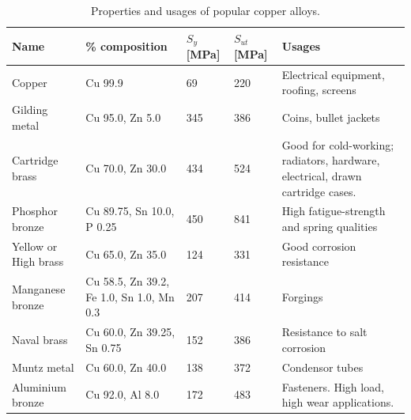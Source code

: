 \documentclass[
10pt,
a4paper,
openany,
svgnames,
]{book}
\begin{document}
\begin{table}[H]
  \centering
  \caption{Properties and usages of popular copper alloys.}
  \label{tab: copper alloy props and uses}
  {\renewcommand{\arraystretch}{1.4}
  \begin{tabular}{lL{3cm}llL{4cm}}
    \toprule
    Name                 & \% composition                           & $S_y$ [MPa] & $S_{ut}$ [MPa] & Usages                                                                                              \\
    \midrule
    Copper               & Cu 99.9                                  & 69          & 220             & Electrical equipment, roofing, screens                                                                   \\
    Gilding metal        & Cu 95.0, Zn 5.0                          & 345          & 386             & Coins, bullet jackets                                                                                    \\
    Cartridge brass      & Cu 70.0, Zn 30.0                         & 434          & 524             & Good for cold-working; radiators, hardware, electrical, drawn cartridge cases.                           \\
    Phosphor bronze      & Cu 89.75, Sn 10.0, P 0.25                & 450           & 841            & High fatigue-strength and spring qualities                                                               \\
    Yellow or High brass & Cu 65.0, Zn 35.0                         & 124          & 331           & Good corrosion resistance                                                                                \\
    Manganese bronze     & Cu 58.5, Zn 39.2, Fe 1.0, Sn 1.0, Mn 0.3 & 207          & 414             & Forgings                                                                                                 \\
    Naval brass          & Cu 60.0, Zn 39.25, Sn 0.75               & 152          & 386             & Resistance to salt corrosion                                                                             \\
    Muntz metal          & Cu 60.0, Zn 40.0                         & 138          & 372             & Condensor tubes                                                                                          \\
    Aluminium bronze     & Cu 92.0, Al 8.0                          & 172          & 483             & Fasteners. High load, high wear applications.                                                                                                        \\

\end{tabular}}
\end{table}
\end{document}

